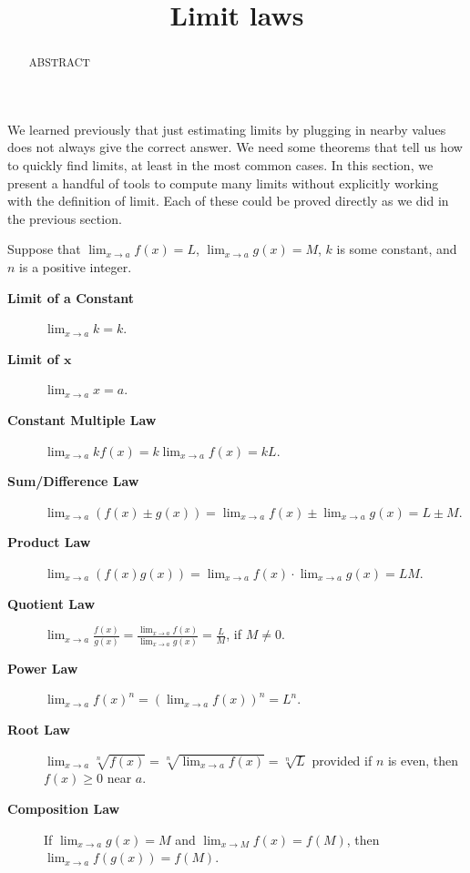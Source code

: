 \documentclass{ximera}
\title{Limit laws}
\begin{document}
\begin{abstract}
ABSTRACT
\end{abstract}
\maketitle

We learned previously that just estimating limits by plugging in
nearby values does not always give the correct answer.  We need some
theorems that tell us how to quickly find limits, at least in the most
common cases.  In this section, we present a handful of tools to
compute many limits without explicitly working with the definition of
limit. Each of these could be proved directly as we did in the
previous section.

\begin{theorem}\label{theorem:limit-laws}
Suppose that $\lim_{x\to a}f(x)=L$, $\lim_{x\to a}g(x)=M$, $k$
is some constant, and $n$ is a positive integer.
\begin{description}
\item[\textbf{Limit of a Constant}] $\lim_{x\to a} k = k$.
\item[\textbf{Limit of $\boldsymbol{x}$}] $\lim_{x\to a}x =a$.
\item[\textbf{Constant Multiple Law}] $\lim_{x\to a} kf(x) = k\lim_{x\to a}f(x)=kL$.
\item[\textbf{Sum/Difference Law}] $\lim_{x\to a} (f(x) \pm g(x)) = \lim_{x\to a}f(x) \pm \lim_{x\to a}g(x)=L \pm M$.  
\item[\textbf{Product Law}] $\lim_{x\to a} (f(x)g(x)) = \lim_{x\to a}f(x)\cdot\lim_{x\to a}g(x)=LM$. 
\item[\textbf{Quotient Law}] $\lim_{x\to a} \frac{f(x)}{g(x)} =
  \frac{\lim_{x\to a}f(x)}{\lim_{x\to a}g(x)}=\frac{L}{M}$, if $M\ne0$.
\item[\textbf{Power Law}] $\lim_{x\to a} f(x)^n = \left(\lim_{x\to a}f(x)\right)^n=L^n$.
\item[\textbf{Root Law}] $\lim_{x\to a} \sqrt[n]{f(x)}
  = \sqrt[n]{\lim_{x\to  a}f(x)}=\sqrt[n]{L}$ provided if $n$ is even, then $f(x)\ge 0$
  near $a$.
\item[\textbf{Composition Law}] If $\lim_{x\to a}g(x)=M$ and
  $\lim_{x\to M}f(x) = f(M)$, then $\lim_{x\to a} f(g(x)) = f(M)$.
\end{description}
\label{thm:limit laws}
\end{theorem}
\end{document}
